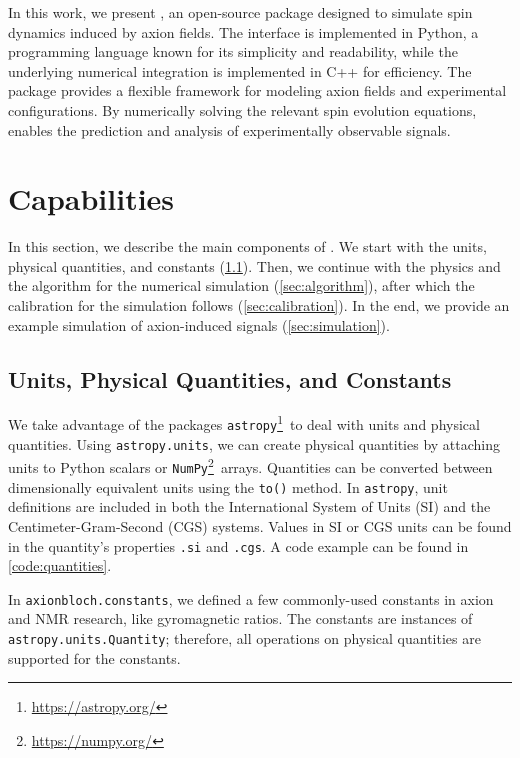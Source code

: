 \documentclass[%
 reprint,
nofootinbib,
 amsmath,amssymb,
 aps,
]{revtex4-2}
\begin{document}
In this work, we present \axionbloch{}, an open-source package designed to simulate spin dynamics induced by axion fields. 
The interface is implemented in Python, a programming language known for its simplicity and readability, while the underlying numerical integration is implemented in C++ for efficiency. 
The package provides a flexible framework for modeling axion fields and experimental configurations. 
By numerically solving the relevant spin evolution equations, \axionbloch{} enables the prediction and analysis of experimentally observable signals.

\section{Capabilities}
\label{sec:capabilities}

In this section, we describe the main components of \axionbloch{}. We start with the units, physical quantities, and constants (\cref{sec:units_quantities_constants}). Then, we continue with the physics and the algorithm for the numerical simulation (\cref{sec:algorithm}), after which the calibration for the simulation follows (\cref{sec:calibration}). In the end, we provide an example simulation of axion-induced signals (\cref{sec:simulation}). 


\subsection{Units, Physical Quantities, and Constants}


\label{sec:units_quantities_constants}

We take advantage of the packages \texttt{astropy}\footnote{\url{https://astropy.org/}}\,\cite{Astropy2013} to deal with units and physical quantities. 
Using \texttt{astropy.units}, we can create physical quantities by attaching units to Python scalars or \texttt{NumPy}\footnote{\url{https://numpy.org/}}\,\cite{Harris2020_NumPy} arrays. 
Quantities can be converted between dimensionally equivalent units using the \texttt{to()} method.
In \texttt{astropy}, unit definitions are included in both the International System of Units (SI) and the Centimeter-Gram-Second (CGS) systems. 
Values in SI or CGS units can be found in the quantity's properties \texttt{.si} and \texttt{.cgs}.
A code example can be found in \cref{code:quantities}. 

In \texttt{axionbloch.constants}, we defined a few commonly-used constants in axion and NMR research, like gyromagnetic ratios. 
The constants are instances of \texttt{astropy.units.Quantity}; therefore, all operations on physical quantities are supported for the constants. 
\end{document}
